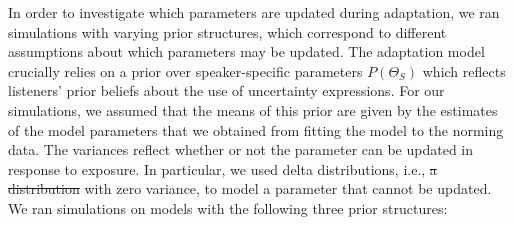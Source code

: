 \documentclass[man, floatsintext]{apa6}
\providecommand{\DIFadd}[1]{{\protect\color{blue}\uwave{#1}}} %
\providecommand{\DIFdel}[1]{{\protect\color{red}\sout{#1}}}                      %
\providecommand{\DIFaddbegin}{} %
\providecommand{\DIFaddend}{} %
\providecommand{\DIFdelbegin}{} %
\providecommand{\DIFdelend}{} %
\newcommand{\DIFscaledelfig}{0.5}
\newlength{\DIFdelgraphicswidth} %
\newlength{\DIFdelgraphicsheight} %
\newcommand{\DIFaddincludegraphics}[2][]{{\color{blue}\fbox{\DIFOincludegraphics[#1]{#2}}}} %
\newcommand{\DIFdelincludegraphics}[2][]{%
\sbox{\DIFdelgraphicsbox}{\DIFOincludegraphics[#1]{#2}}%
\settoboxwidth{\DIFdelgraphicswidth}{\DIFdelgraphicsbox} %
\settoboxtotalheight{\DIFdelgraphicsheight}{\DIFdelgraphicsbox} %
\scalebox{\DIFscaledelfig}{%
\parbox[b]{\DIFdelgraphicswidth}{\usebox{\DIFdelgraphicsbox}\\[-\baselineskip] \rule{\DIFdelgraphicswidth}{0em}}\llap{\resizebox{\DIFdelgraphicswidth}{\DIFdelgraphicsheight}{%
\setlength{\unitlength}{\DIFdelgraphicswidth}%
\begin{picture}(1,1)%
\thicklines\linethickness{2pt} %
{\color[rgb]{1,0,0}\put(0,0){\framebox(1,1){}}}%
{\color[rgb]{1,0,0}\put(0,0){\line( 1,1){1}}}%
{\color[rgb]{1,0,0}\put(0,1){\line(1,-1){1}}}%
\end{picture}%
}\hspace*{3pt}}} %
} %
\DeclareRobustCommand{\DIFaddbegin}{\DIFOaddbegin \let\includegraphics\DIFaddincludegraphics} %
\DeclareRobustCommand{\DIFaddend}{\DIFOaddend \let\includegraphics\DIFOincludegraphics} %
\DeclareRobustCommand{\DIFdelbegin}{\DIFOdelbegin \let\includegraphics\DIFdelincludegraphics} %
\DeclareRobustCommand{\DIFdelend}{\DIFOaddend \let\includegraphics\DIFOincludegraphics} %
\begin{document}
In order to investigate which parameters are updated during adaptation, we ran simulations
with varying prior structures, which correspond to different assumptions about which parameters may be updated.
The adaptation model crucially relies on a prior over speaker-specific parameters $P(\Theta_S)$
which reflects listeners' prior beliefs about the use of uncertainty expressions. For our simulations,
we assumed that the means of this prior are given by the estimates of the model parameters that 
we obtained from fitting the model to the norming data. The variances reflect whether or not the parameter can be updated in response to exposure. In particular, we used delta distributions, i.e., \DIFdelbegin \DIFdel{a distribution }\DIFdelend \DIFaddbegin \DIFadd{distributions }\DIFaddend with zero variance, to model a parameter that cannot be updated. We ran simulations on models with the following three prior structures:
\end{document}
